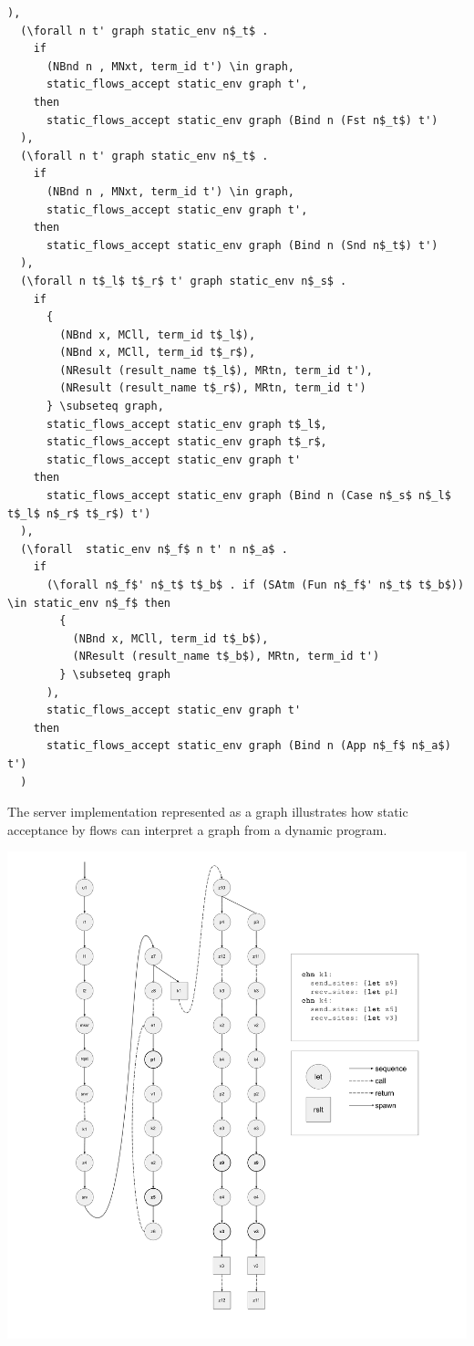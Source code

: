 \documentclass[10pt]{article}
\begin{document}
\begin{lstlisting}[language=logic, mathescape]
  ),
  (\forall n t' graph static_env n$_t$ .
    if
      (NBnd n , MNxt, term_id t') \in graph, 
      static_flows_accept static_env graph t', 
    then
      static_flows_accept static_env graph (Bind n (Fst n$_t$) t')
  ),
  (\forall n t' graph static_env n$_t$ .
    if
      (NBnd n , MNxt, term_id t') \in graph, 
      static_flows_accept static_env graph t', 
    then
      static_flows_accept static_env graph (Bind n (Snd n$_t$) t')
  ),
  (\forall n t$_l$ t$_r$ t' graph static_env n$_s$ .
    if
      {
        (NBnd x, MCll, term_id t$_l$),
        (NBnd x, MCll, term_id t$_r$),
        (NResult (result_name t$_l$), MRtn, term_id t'),
        (NResult (result_name t$_r$), MRtn, term_id t')
      } \subseteq graph, 
      static_flows_accept static_env graph t$_l$, 
      static_flows_accept static_env graph t$_r$,
      static_flows_accept static_env graph t'
    then
      static_flows_accept static_env graph (Bind n (Case n$_s$ n$_l$ t$_l$ n$_r$ t$_r$) t')
  ),
  (\forall  static_env n$_f$ n t' n n$_a$ .
    if
      (\forall n$_f$' n$_t$ t$_b$ . if (SAtm (Fun n$_f$' n$_t$ t$_b$)) \in static_env n$_f$ then 
        {
          (NBnd x, MCll, term_id t$_b$),
          (NResult (result_name t$_b$), MRtn, term_id t')
        } \subseteq graph
      ),
      static_flows_accept static_env graph t'
    then
      static_flows_accept static_env graph (Bind n (App n$_f$ n$_a$) t')
  )
\end{lstlisting}

The server implementation represented as a graph illustrates how static acceptance by flows can interpret
a graph from a dynamic program.

\includegraphics[width=1.3\textwidth, left]{cml_graph.pdf}
\end{document}
